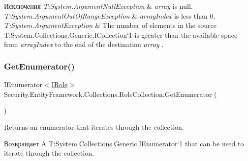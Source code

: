 \begin{DoxyExceptions}{Исключения}
{\em T\+:\+System.\+Argument\+Null\+Exception} & {\itshape array}  is null.\\
\hline
{\em T\+:\+System.\+Argument\+Out\+Of\+Range\+Exception} & {\itshape array\+Index}  is less than 0.\\
\hline
{\em T\+:\+System.\+Argument\+Exception} & The number of elements in the source T\+:\+System.\+Collections.\+Generic.\+I\+Collection`1 is greater than the available space from {\itshape array\+Index}  to the end of the destination {\itshape array} .\\
\hline
\end{DoxyExceptions}
\mbox{\label{class_security_1_1_entity_framework_1_1_collections_1_1_role_collection_a254b24307d0ef04c17517e8175841c80}} 
\subsubsection{\texorpdfstring{Get\+Enumerator()}{GetEnumerator()}}
{\footnotesize\ttfamily I\+Enumerator$<$\hyperlink{interface_security_1_1_interfaces_1_1_model_1_1_i_role}{I\+Role}$>$ Security.\+Entity\+Framework.\+Collections.\+Role\+Collection.\+Get\+Enumerator (\begin{DoxyParamCaption}{ }\end{DoxyParamCaption})}



Returns an enumerator that iterates through the collection. 

\begin{DoxyReturn}{Возвращает}
A T\+:\+System.\+Collections.\+Generic.\+I\+Enumerator`1 that can be used to iterate through the collection. 
\end{DoxyReturn}
\mbox{\label{class_security_1_1_entity_framework_1_1_collections_1_1_role_collection_ad08fece8ec6dcc419706c59bd4963a75}} 
